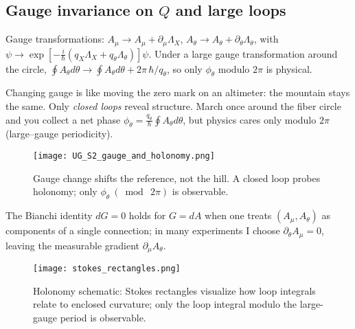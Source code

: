 \subsection{Gauge invariance on \texorpdfstring{$Q$}{Q} and large loops}\label{sec:gauge-invariance}
Gauge transformations: $A_\mu\to A_\mu+\partial_\mu\Lambda_X$, $A_\theta\to A_\theta+\partial_\theta\Lambda_\theta$, with $\psi\to \exp\!\left[-\tfrac{i}{\hbar}(q_X\Lambda_X+q_\theta\Lambda_\theta)\right]\psi$. Under a large gauge transformation around the circle, $\oint A_\theta d\theta \to \oint A_\theta d\theta + 2\pi\,\hbar/q_\theta$, so only $\phi_\theta$ modulo $2\pi$ is physical.

\begin{idea}
Changing gauge is like moving the zero mark on an altimeter: the mountain stays the same. Only \emph{closed loops} reveal structure. March once around the fiber circle and you collect a net phase $\phi_\theta=\tfrac{q_\theta}{\hbar}\oint A_\theta d\theta$, but physics cares only modulo $2\pi$ (large–gauge periodicity).
\end{idea}

\begin{figure}[htbp]
  \centering
  \texttt{[image: UG\_S2\_gauge\_and\_holonomy.png]}
  \caption{Gauge change shifts the reference, not the hill. A closed loop probes holonomy; only $\phi_\theta\ (\bmod\ 2\pi)$ is observable.}
  \label{fig:ug-holonomy}
\end{figure}

The Bianchi identity $dG=0$ holds for $G=dA$ when one treats $(A_\mu, A_\theta)$ as components of a single connection; in many experiments I choose $\partial_\theta A_\mu=0$, leaving the measurable gradient $\partial_\mu A_\theta$.

\begin{figure}[htbp]
  \centering
  \texttt{[image: stokes\_rectangles.png]}
  \caption{Holonomy schematic: Stokes rectangles visualize how loop integrals relate to enclosed curvature; only the loop integral modulo the large-gauge period is observable.}
  \label{fig:stokes}
\end{figure}

